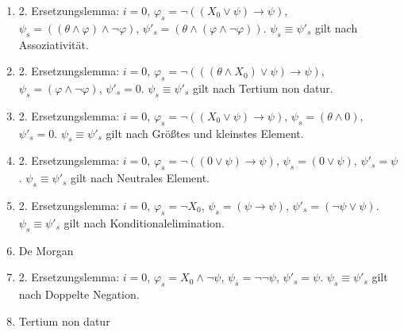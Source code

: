 \documentclass[12pt,a4paper]{scrartcl}
\begin{document}
\begin{enumerate} 
\item 2. Ersetzungslemma:
    $i = 0$, $\varphi_s = \neg ((X_0 \vee \psi) \rightarrow \psi)$, $\psi_s = ((\theta \wedge \varphi) \wedge \neg \varphi)$, $\psi'_s = (\theta \wedge (\varphi \wedge \neg \varphi))$.
    $\psi_s \equiv \psi'_s$ gilt nach Assoziativität.
  \item 2. Ersetzungslemma:
    $i = 0$, $\varphi_s = \neg(((\theta \wedge X_0) \vee \psi) \rightarrow \psi)$, $\psi_s = (\varphi \wedge \neg \varphi)$, $\psi'_s = 0$.
    $\psi_s \equiv \psi'_s$ gilt nach Tertium non datur.
  \item 2. Ersetzungslemma:
    $i = 0$, $\varphi_s = \neg((X_0 \vee \psi) \rightarrow \psi)$, $\psi_s = (\theta \wedge 0)$, $\psi'_s = 0$.
    $\psi_s \equiv \psi'_s$ gilt nach Größtes und kleinstes Element.
  \item 2. Ersetzungslemma:
    $i = 0$, $\varphi_s = \neg((0 \vee \psi) \rightarrow \psi)$, $\psi_s = (0 \vee \psi)$, $\psi'_s = \psi$.
    $\psi_s \equiv \psi'_s$ gilt nach Neutrales Element.
  \item 2. Ersetzungslemma:
    $i = 0$, $\varphi_s = \neg X_0$, $\psi_s = (\psi \rightarrow \psi)$, $\psi'_s = (\neg \psi \vee \psi)$.
    $\psi_s \equiv \psi'_s$ gilt nach Konditionalelimination.
  \item De Morgan
  \item 2. Ersetzungslemma:
    $i = 0$, $\varphi_s = X_0 \wedge \neg \psi$, $\psi_s = \neg \neg \psi$, $\psi'_s = \psi$.
    $\psi_s \equiv \psi'_s$ gilt nach Doppelte Negation.
  \item Tertium non datur
\end{enumerate}
\end{document}
